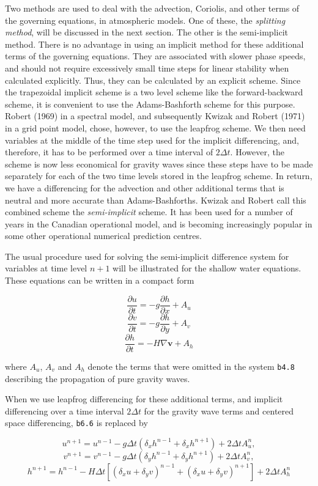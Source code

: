 Two methods are used to deal with the advection, Coriolis, and other
terms of the governing equations, in atmospheric models. One of these,
the \emph{splitting method}, will be discussed in the next section. The
other is the semi-implicit method. There is no advantage in using an
implicit method for these additional terms of the governing equations.
They are associated with slower phase speeds, and should not require
excessively small time steps for linear stability when calculated
explicitly. Thus, they can be calculated by an explicit scheme. Since
the trapezoidal implicit scheme is a two level scheme like the
forward-backward scheme, it is convenient to use the Adams-Bashforth
scheme for this purpose. Robert (1969) in a spectral model, and
subsequently Kwizak and Robert (1971) in a grid point model, chose,
however, to use the leapfrog scheme. We then need variables at the
middle of the time step used for the implicit differencing, and,
therefore, it has to be performed over a time interval of \(2\Delta t\).
However, the scheme is now less economical for gravity waves since these
steps have to be made separately for each of the two time levels stored
in the leapfrog scheme. In return, we have a differencing for the
advection and other additional terms that is neutral and more accurate
than Adams-Bashforth\textquotesingle s. Kwizak and Robert call this
combined scheme the \emph{semi-implicit} scheme. It has been used for a
number of years in the Canadian operational model, and is becoming
increasingly popular in some other operational numerical prediction
centres.

The usual procedure used for solving the semi-implicit difference system
for variables at time level \(n + 1\) will be illustrated for the
shallow water equations. These equations can be written in a compact
form

\[\frac{\partial u}{\partial t} = - g\frac{\partial h}{\partial x} + A_{u}\]\[\frac{\partial v}{\partial t} = - g\frac{\partial h}{\partial y} + A_{v}\]\[\frac{\partial h}{\partial t} = - H\nabla\textbf{v} + A_{h}\]

where \(A_{u}\), \(A_{v}\) and \(A_{h}\) denote the terms that were
omitted in the system \texttt{b4.8} describing the propagation of pure
gravity waves.

When we use leapfrog differencing for these additional terms, and
implicit differencing over a time interval \(2\Delta t\) for the gravity
wave terms and centered space differencing, \texttt{b6.6} is replaced by

\[u^{n + 1} = u^{n - 1} - g\Delta t\left( \delta_{x}h^{n - 1} + \delta_{x}h^{n + 1} \right) + 2\Delta t A_{u}^{n},\]\[v^{n + 1} = v^{n - 1} - g\Delta t\left( \delta_{y}h^{n - 1} + \delta_{y}h^{n + 1} \right) + 2\Delta t A_{v}^{n},\]\[h^{n + 1} = h^{n - 1} - H\Delta t\left[ \left( \delta_{x}u + \delta_{y}v \right)^{n - 1} + \left( \delta_{x}u + \delta_{y}v \right)^{n + 1} \right] +  2\Delta t A_{h}^{n}\]

